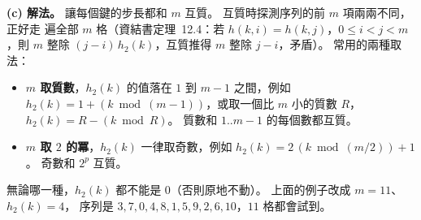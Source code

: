 \begin{pastsoln}
\textbf{(c) 解法。} 讓每個鍵的步長都和 $m$ 互質。 互質時探測序列的前 $m$ 項兩兩不同，正好走
遍全部 $m$ 格（資結書定理~12.4：若 $h(k, i) = h(k, j)$，$0 \le i < j < m$，則 $m$ 整除
$(j - i)\,h_2(k)$，互質推得 $m$ 整除 $j - i$，矛盾）。 常用的兩種取法：
\begin{itemize}
\item \textbf{$m$ 取質數}，$h_2(k)$ 的值落在 $1$ 到 $m - 1$ 之間，例如
$h_2(k) = 1 + (k \bmod (m - 1))$，或取一個比 $m$ 小的質數 $R$，$h_2(k) = R - (k \bmod R)$。
質數和 $1..m-1$ 的每個數都互質。
\item \textbf{$m$ 取 $2$ 的冪}，$h_2(k)$ 一律取奇數，例如 $h_2(k) = 2\,(k \bmod (m/2)) + 1$。
奇數和 $2^p$ 互質。
\end{itemize}
無論哪一種，$h_2(k)$ 都不能是 $0$（否則原地不動）。 上面的例子改成 $m = 11$、$h_2(k) = 4$，
序列是 $3, 7, 0, 4, 8, 1, 5, 9, 2, 6, 10$，$11$ 格都會試到。
\end{pastsoln}
